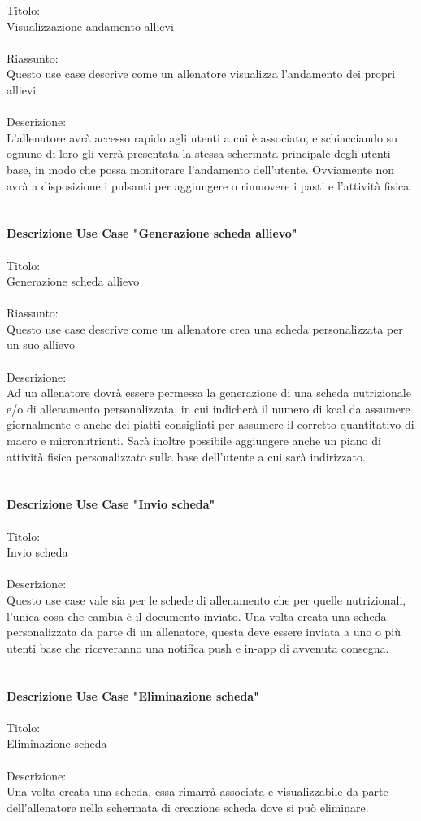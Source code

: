 \documentclass{article}
\begin{document}
Titolo:\\
Visualizzazione andamento allievi\\
\\
Riassunto:\\
Questo use case descrive come un allenatore visualizza l’andamento dei propri allievi\\
\\
Descrizione:\\
L’allenatore avrà accesso rapido agli utenti a cui è associato, e schiacciando su ognuno di loro gli verrà presentata la stessa schermata
principale degli utenti base, in modo che possa monitorare l’andamento dell’utente. Ovviamente non avrà a disposizione i pulsanti per aggiungere o
rimuovere i pasti e l’attività fisica.\\
\\
\\
\textbf{Descrizione Use Case "Generazione scheda allievo"}\\
\\
Titolo:\\
Generazione scheda allievo\\
\\
Riassunto:\\
Questo use case descrive come un allenatore crea una scheda personalizzata per un suo allievo\\
\\
Descrizione:\\
Ad un allenatore dovrà essere permessa la generazione di una scheda nutrizionale e/o di allenamento personalizzata, in cui indicherà il numero di
kcal da assumere giornalmente e anche dei piatti consigliati per assumere il corretto quantitativo di macro e micronutrienti. Sarà inoltre possibile
aggiungere anche un piano di attività fisica personalizzato sulla base dell’utente a cui sarà indirizzato.\\
\\
\\
\textbf{Descrizione Use Case "Invio scheda"}\\
\\
Titolo:\\
Invio scheda\\
\\
Descrizione:\\
Questo use case vale sia per le schede di allenamento che per quelle nutrizionali, l’unica cosa che cambia è il documento inviato. Una volta creata
una scheda personalizzata da parte di un allenatore, questa deve essere inviata a uno o più utenti base che riceveranno una notifica push e in-app
di avvenuta consegna.\\
\\
\\
\textbf{Descrizione Use Case "Eliminazione scheda"}\\
\\
Titolo:\\ 
Eliminazione scheda\\
\\
Descrizione:\\ 
Una volta creata una scheda, essa rimarrà associata e visualizzabile da parte dell’allenatore nella schermata di creazione scheda dove si può
eliminare.\\
\end{document}
